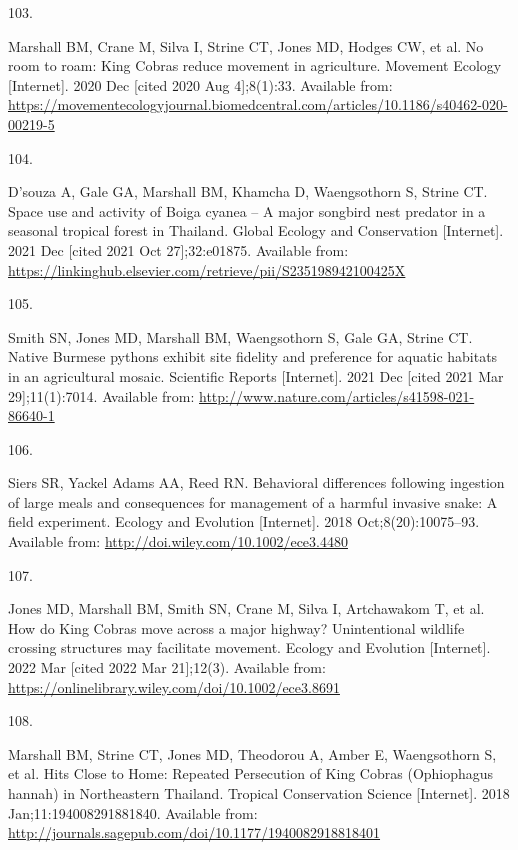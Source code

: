 \documentclass[10pt,a4paper]{article}
\newlength{\cslhangindent}
\newlength{\csllabelwidth}
\newlength{\cslentryspacingunit} %
\newenvironment{CSLReferences}[2] %
 {%
  \setlength{\parindent}{0pt}
  \ifodd #1
  \let\oldpar\par
  \def\par{\hangindent=\cslhangindent\oldpar}
  \fi
  \setlength{\parskip}{#2\cslentryspacingunit}
 }%
 {}
\newcommand{\CSLLeftMargin}[1]{\parbox[t]{\csllabelwidth}{#1}}
\newcommand{\CSLRightInline}[1]{\parbox[t]{\linewidth - \csllabelwidth}{#1}\break}
\begin{document}
\begin{CSLReferences}{0}{0}
\leavevmode\hypertarget{ref-marshall_no_2020}{}%
\CSLLeftMargin{103. }
\CSLRightInline{Marshall BM, Crane M, Silva I, Strine CT, Jones MD, Hodges CW, et al. No room to roam: {King} {Cobras} reduce movement in agriculture. Movement Ecology {[}Internet{]}. 2020 Dec {[}cited 2020 Aug 4{]};8(1):33. Available from: \url{https://movementecologyjournal.biomedcentral.com/articles/10.1186/s40462-020-00219-5}}

\leavevmode\hypertarget{ref-dsouza_space_2021}{}%
\CSLLeftMargin{104. }
\CSLRightInline{D'souza A, Gale GA, Marshall BM, Khamcha D, Waengsothorn S, Strine CT. Space use and activity of {Boiga} cyanea -- {A} major songbird nest predator in a seasonal tropical forest in {Thailand}. Global Ecology and Conservation {[}Internet{]}. 2021 Dec {[}cited 2021 Oct 27{]};32:e01875. Available from: \url{https://linkinghub.elsevier.com/retrieve/pii/S235198942100425X}}

\leavevmode\hypertarget{ref-smith_native_2021}{}%
\CSLLeftMargin{105. }
\CSLRightInline{Smith SN, Jones MD, Marshall BM, Waengsothorn S, Gale GA, Strine CT. Native {Burmese} pythons exhibit site fidelity and preference for aquatic habitats in an agricultural mosaic. Scientific Reports {[}Internet{]}. 2021 Dec {[}cited 2021 Mar 29{]};11(1):7014. Available from: \url{http://www.nature.com/articles/s41598-021-86640-1}}

\leavevmode\hypertarget{ref-Siers2018}{}%
\CSLLeftMargin{106. }
\CSLRightInline{Siers SR, Yackel Adams AA, Reed RN. Behavioral differences following ingestion of large meals and consequences for management of a harmful invasive snake: {A} field experiment. Ecology and Evolution {[}Internet{]}. 2018 Oct;8(20):10075--93. Available from: \url{http://doi.wiley.com/10.1002/ece3.4480}}

\leavevmode\hypertarget{ref-jones_how_2022}{}%
\CSLLeftMargin{107. }
\CSLRightInline{Jones MD, Marshall BM, Smith SN, Crane M, Silva I, Artchawakom T, et al. How do {King} {Cobras} move across a major highway? {Unintentional} wildlife crossing structures may facilitate movement. Ecology and Evolution {[}Internet{]}. 2022 Mar {[}cited 2022 Mar 21{]};12(3). Available from: \url{https://onlinelibrary.wiley.com/doi/10.1002/ece3.8691}}

\leavevmode\hypertarget{ref-Marshall2018b}{}%
\CSLLeftMargin{108. }
\CSLRightInline{Marshall BM, Strine CT, Jones MD, Theodorou A, Amber E, Waengsothorn S, et al. Hits {Close} to {Home}: {Repeated} {Persecution} of {King} {Cobras} ({Ophiophagus} hannah) in {Northeastern} {Thailand}. Tropical Conservation Science {[}Internet{]}. 2018 Jan;11:194008291881840. Available from: \url{http://journals.sagepub.com/doi/10.1177/1940082918818401}}


\end{CSLReferences}
\end{document}
